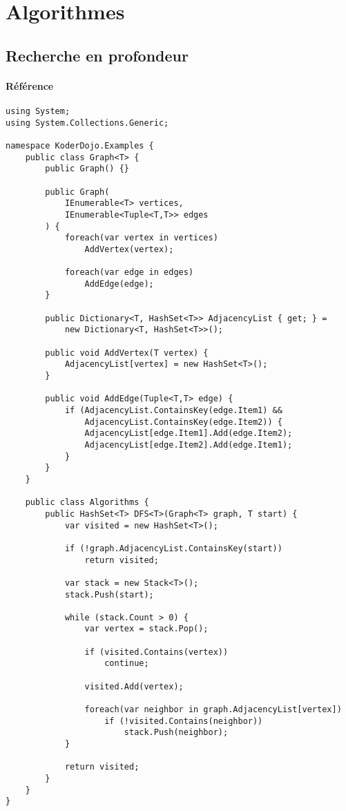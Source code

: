 \newpage
\section{Algorithmes}
\label{algorithms}

\subsection{Recherche en profondeur} 
\paragraph{Référence} \cite{Algorithm2}
\begin{lstlisting}
using System;
using System.Collections.Generic;

namespace KoderDojo.Examples {
    public class Graph<T> {
        public Graph() {}

        public Graph(
            IEnumerable<T> vertices,
            IEnumerable<Tuple<T,T>> edges
        ) {
            foreach(var vertex in vertices)
                AddVertex(vertex);

            foreach(var edge in edges)
                AddEdge(edge);
        }

        public Dictionary<T, HashSet<T>> AdjacencyList { get; } =
            new Dictionary<T, HashSet<T>>();

        public void AddVertex(T vertex) {
            AdjacencyList[vertex] = new HashSet<T>();
        }

        public void AddEdge(Tuple<T,T> edge) {
            if (AdjacencyList.ContainsKey(edge.Item1) &&
                AdjacencyList.ContainsKey(edge.Item2)) {
                AdjacencyList[edge.Item1].Add(edge.Item2);
                AdjacencyList[edge.Item2].Add(edge.Item1);
            }
        }
    }

    public class Algorithms {
        public HashSet<T> DFS<T>(Graph<T> graph, T start) {
            var visited = new HashSet<T>();

            if (!graph.AdjacencyList.ContainsKey(start))
                return visited;
                
            var stack = new Stack<T>();
            stack.Push(start);

            while (stack.Count > 0) {
                var vertex = stack.Pop();

                if (visited.Contains(vertex))
                    continue;

                visited.Add(vertex);

                foreach(var neighbor in graph.AdjacencyList[vertex])
                    if (!visited.Contains(neighbor))
                        stack.Push(neighbor);
            }

            return visited;
        }
    }
}
\end{lstlisting}    

